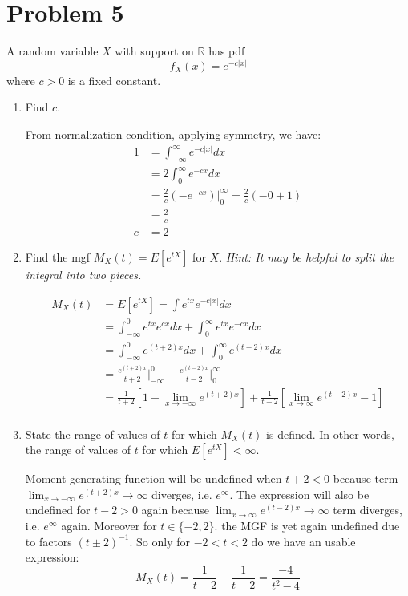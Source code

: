 \documentclass{article}
\newcommand{\1}{\mathbf{1}}
\begin{document}
\newpage
\section*{Problem 5}
A random variable $X$ with support on $\mathbb{R}$ has pdf 
$$ f_X(x) = e^{-c|x|}$$
where $c >0$ is a fixed constant.
\begin{enumerate}

    \item Find $c$.
    
    From normalization condition, applying symmetry, we have:
    \begin{align*}
      1 &= \int_{-\infty}^\infty e^{-c|x|}dx \\
      &= 2\int_{0}^\infty e^{-cx}dx  \\
      &= \frac{2}{c} (-e^{-cx})\big|_0^\infty = \frac{2}{c} (-0+1) \\
      &= \frac{2}{c} \\
      c &= 2
    \end{align*}    

    \item Find the mgf $M_X(t) = E[e^{tX}]$ for $X$. {\it Hint: It may be helpful to split the integral into two pieces.}
    
    \begin{align*}
      M_X(t) &= E[e^{tX}] = \int e^{tx} e^{-c|x|} dx  \\
      &= \int_{-\infty}^0 e^{tx} e^{cx} dx + \int_{0}^\infty e^{tx} e^{-cx} dx  \\
      &= \int_{-\infty}^0 e^{(t+2)x} dx + \int_{0}^\infty e^{(t-2)x} dx  \\
      &= \frac{e^{(t+2)x}}{t+2}\bigg|_{-\infty}^0 + \frac{e^{(t-2)x}}{t-2}\bigg|_0^{\infty}  \\
      &= \frac{1}{t+2} \left[ 1 - \lim_{x\rightarrow -\infty} e^{(t+2)x} \right]  +  \frac{1}{t-2} \left[ \lim_{x\rightarrow \infty} e^{(t-2)x} - 1 \right]  \\
    \end{align*}    
    
    \item  State the range of values of $t$ for which $M_X(t)$ is defined. In other words, the range of values of $t$ for which $E[e^{tX}] < \infty$.
    
    Moment generating function will be undefined when $t+2<0$ because term $\lim_{x\rightarrow -\infty} e^{(t+2)x} \rightarrow \infty$ diverges, i.e. $e^\infty$. The expression will also be undefined for $t-2>0$ again because $\lim_{x\rightarrow \infty} e^{(t-2)x} \rightarrow \infty$ term diverges, i.e. $e^\infty$ again. Moreover for $t\in \{-2, 2\}$. the MGF is yet again undefined due to factors $(t\pm 2)^{-1}$. So only for $-2<t<2$ do we have an usable expression: 
    $$M_X(t) = \frac{1}{t+2}  -  \frac{1}{t-2} = \frac{-4}{t^2-4} $$
    

\end{enumerate}
\end{document}
